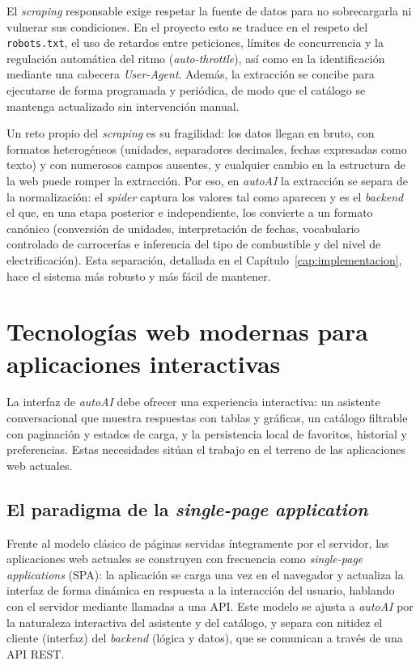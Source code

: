 El \emph{scraping} responsable exige respetar la fuente de datos para no
sobrecargarla ni vulnerar sus condiciones. En el proyecto esto se traduce en el
respeto del \texttt{robots.txt}, el uso de retardos entre peticiones, límites de
concurrencia y la regulación automática del ritmo (\emph{auto-throttle}), así
como en la identificación mediante una cabecera \emph{User-Agent}. Además, la
extracción se concibe para ejecutarse de forma programada y periódica, de modo que
el catálogo se mantenga actualizado sin intervención manual.

Un reto propio del \emph{scraping} es su fragilidad: los datos llegan en bruto,
con formatos heterogéneos (unidades, separadores decimales, fechas expresadas como
texto) y con numerosos campos ausentes, y cualquier cambio en la estructura de la
web puede romper la extracción. Por eso, en \emph{autoAI} la extracción se separa
de la normalización: el \emph{spider} captura los valores tal como aparecen y es el
\emph{backend} el que, en una etapa posterior e independiente, los convierte a un
formato canónico (conversión de unidades, interpretación de fechas, vocabulario
controlado de carrocerías e inferencia del tipo de combustible y del nivel de
electrificación). Esta separación, detallada en el
Capítulo~\ref{cap:implementacion}, hace el sistema más robusto y más fácil de
mantener.

\section{Tecnologías web modernas para aplicaciones interactivas}
\label{sec:arte-web}

La interfaz de \emph{autoAI} debe ofrecer una experiencia interactiva: un
asistente conversacional que muestra respuestas con tablas y gráficas, un catálogo
filtrable con paginación y estados de carga, y la persistencia local de favoritos,
historial y preferencias. Estas necesidades sitúan el trabajo en el terreno de las
aplicaciones web actuales.

\subsection{El paradigma de la \emph{single-page application}}

Frente al modelo clásico de páginas servidas íntegramente por el servidor, las
aplicaciones web actuales se construyen con frecuencia como \emph{single-page
applications} (SPA): la aplicación se carga una vez en el navegador y actualiza la
interfaz de forma dinámica en respuesta a la interacción del usuario, hablando con
el servidor mediante llamadas a una API. Este modelo se ajusta a \emph{autoAI} por
la naturaleza interactiva del asistente y del catálogo, y separa con nitidez el
cliente (interfaz) del \emph{backend} (lógica y datos), que se comunican a través
de una API REST.

